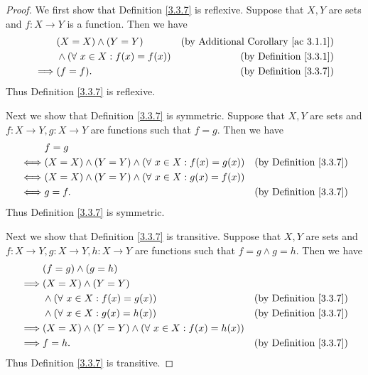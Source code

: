 \begin{proof}
We first show that Definition \ref{3.3.7} is reflexive.
Suppose that \(X, Y\) are sets and \(f : X \to Y\) is a function.
Then we have
\begin{align*}
& (X = X) \land (Y = Y) & \text{(by Additional Corollary \ref{ac 3.1.1})} \\
& \land (\forall\ x \in X : f(x) = f(x)) & \text{(by Definition \ref{3.3.1})} \\
\implies & (f = f). & \text{(by Definition \ref{3.3.7})}
\end{align*}
Thus Definition \ref{3.3.7} is reflexive.

Next we show that Definition \ref{3.3.7} is symmetric.
Suppose that \(X, Y\) are sets and \(f : X \to Y, g : X \to Y\) are functions such that \(f = g\).
Then we have
\begin{align*}
& f = g \\
\iff & (X = X) \land (Y = Y) \land (\forall\ x \in X : f(x) = g(x)) & \text{(by Definition \ref{3.3.7})} \\
\iff & (X = X) \land (Y = Y) \land (\forall\ x \in X : g(x) = f(x)) \\
\iff & g = f. & \text{(by Definition \ref{3.3.7})}
\end{align*}
Thus Definition \ref{3.3.7} is symmetric.

Next we show that Definition \ref{3.3.7} is transitive.
Suppose that \(X, Y\) are sets and \(f : X \to Y, g : X \to Y, h : X \to Y\) are functions such that \(f = g \land g = h\).
Then we have
\begin{align*}
& (f = g) \land (g = h) \\
\implies & (X = X) \land (Y = Y) \\
& \land (\forall\ x \in X : f(x) = g(x)) & \text{(by Definition \ref{3.3.7})} \\
& \land (\forall\ x \in X : g(x) = h(x)) & \text{(by Definition \ref{3.3.7})} \\
\implies & (X = X) \land (Y = Y) \land (\forall\ x \in X : f(x) = h(x)) \\
\implies & f = h. & \text{(by Definition \ref{3.3.7})}
\end{align*}
Thus Definition \ref{3.3.7} is transitive.


\end{proof}
